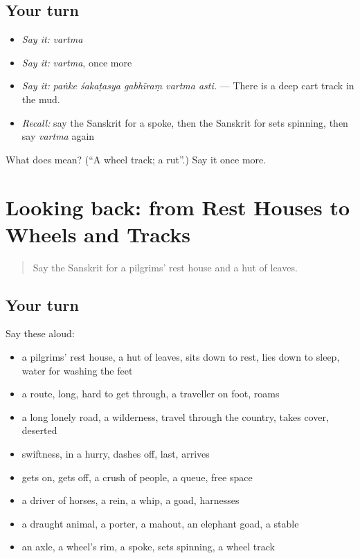 \subsection*{Your turn}
\begin{itemize}
\raggedright
  \item \emph{Say it:} \emph{vartma}
  \item \emph{Say it:} \emph{vartma}, once more
  \item \emph{Say it:} \emph{paṅke śakaṭasya gabhīraṃ vartma asti.} — There is a deep cart track in the mud.
  \item \emph{Recall:} say the Sanskrit for a spoke, then the Sanskrit for sets spinning, then say \emph{vartma} again
\end{itemize}

\begin{tcolorbox}[breakable,colback=teal!4,colframe=teal!35!black,title={Before you move on}]
What does  mean? (\textquotedblleft{}A wheel track; a rut\textquotedblright{}.) Say it once more.
\end{tcolorbox}
\section[(dialogue)]{Looking back: from Rest Houses to Wheels and Tracks}

\label{lesson:SA-R409-review-402-409}



\begin{quote}
Say the Sanskrit for a pilgrims' rest house and a hut of leaves.
\end{quote}

\subsection*{Your turn}
Say these aloud:

\begin{itemize}
\raggedright
  \item a pilgrims' rest house, a hut of leaves, sits down to rest, lies down to sleep, water for washing the feet
  \item a route, long, hard to get through, a traveller on foot, roams
  \item a long lonely road, a wilderness, travel through the country, takes cover, deserted
  \item swiftness, in a hurry, dashes off, last, arrives
  \item gets on, gets off, a crush of people, a queue, free space
  \item a driver of horses, a rein, a whip, a goad, harnesses
  \item a draught animal, a porter, a mahout, an elephant goad, a stable
  \item an axle, a wheel's rim, a spoke, sets spinning, a wheel track
\end{itemize}

